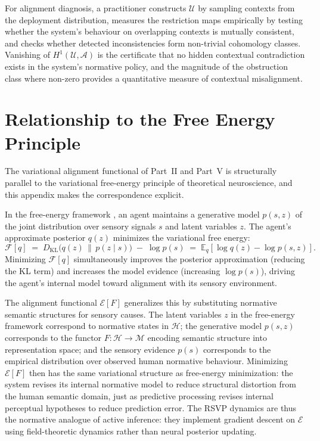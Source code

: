 \documentclass[12pt]{article}
\theoremstyle{definition}
\begin{document}
For alignment diagnosis, a practitioner constructs $\mathcal{U}$ by sampling
contexts from the deployment distribution, measures the restriction maps
empirically by testing whether the system's behaviour on overlapping contexts is
mutually consistent, and checks whether detected inconsistencies form
non-trivial cohomology classes. Vanishing of $H^1(\mathcal{U}, \mathcal{A})$
is the certificate that no hidden contextual contradiction exists in the system's
normative policy, and the magnitude of the obstruction class where non-zero
provides a quantitative measure of contextual misalignment.

\section{Relationship to the Free Energy Principle}
\label{app:fep}

The variational alignment functional of Part~II and Part~V is structurally
parallel to the variational free-energy principle of theoretical neuroscience,
and this appendix makes the correspondence explicit.

In the free-energy framework \citep{friston2010}, an agent maintains a
generative model $p(s, z)$ of the joint distribution over sensory signals $s$
and latent variables $z$. The agent's approximate posterior $q(z)$ minimizes
the variational free energy:
\begin{equation}
  \mathcal{F}[q]
  \;=\;
  D_{\mathrm{KL}}\bigl(q(z) \,\|\, p(z \mid s)\bigr)
  \;-\;
  \log p(s)
  \;=\;
  \mathbb{E}_q[\log q(z) - \log p(s, z)].
\end{equation}
Minimizing $\mathcal{F}[q]$ simultaneously improves the posterior approximation
(reducing the KL term) and increases the model evidence (increasing $\log
p(s)$), driving the agent's internal model toward alignment with its
sensory environment.

The alignment functional $\mathcal{E}[F]$ generalizes this by substituting
normative semantic structures for sensory causes. The latent variables $z$ in
the free-energy framework correspond to normative states in $\mathcal{H}$; the
generative model $p(s, z)$ corresponds to the functor $F : \mathcal{H} \to
\mathcal{M}$ encoding semantic structure into representation space; and the
sensory evidence $p(s)$ corresponds to the empirical distribution over observed
human normative behaviour. Minimizing $\mathcal{E}[F]$ then has the same
variational structure as free-energy minimization: the system revises its
internal normative model to reduce structural distortion from the human semantic
domain, just as predictive processing revises internal perceptual hypotheses to
reduce prediction error. The RSVP dynamics are thus the normative analogue of
active inference: they implement gradient descent on $\mathcal{E}$ using
field-theoretic dynamics rather than neural posterior updating.
\end{document}

